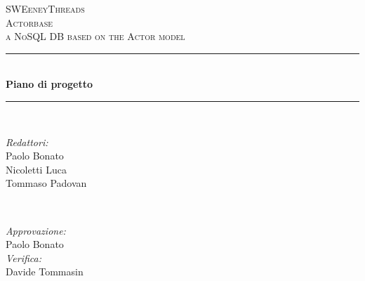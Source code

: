 \documentclass[a4paper]{article}
\begin{document}
	\begin{titlepage}
		\newcommand{\HRule}{\rule{\linewidth}{0.5mm}} 
		\center  
		
		\textsc{\LARGE SWEeneyThreads}\\[1.5cm] 
		\textsc{\Large Actorbase}\\[0.5cm] 
		\textsc{\large a NoSQL DB based on the Actor model}\\[0.5cm]
		
		
		\HRule \\[0.4cm]
		{ \huge \bfseries Piano di progetto}\\[0.4cm] 
		\HRule \\[1.5cm]
		
		\begin{minipage}{0.4\textwidth}
			\begin{flushleft} \large
				\emph{Redattori:}\\
				Paolo Bonato\\
				Nicoletti Luca\\
				Tommaso Padovan\\
			\end{flushleft}
		\end{minipage}
		~
		\begin{minipage}{0.4\textwidth}
			\begin{flushright} \large
				\emph{Approvazione:}\\
				Paolo Bonato\\
				\emph{Verifica:} \\
				Davide Tommasin\\
			\end{flushright}
		\end{minipage}
		

\end{titlepage}
\end{document}
